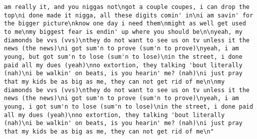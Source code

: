 \documentclass[]{article}
\begin{document}
\begin{verbatim}
am really it, and you niggas not\ngot a couple coupes, i can drop the top\ni done made it nigga, all these digits comin' in\ni am savin' for the bigger picture\nknow one day i need them\nmight as well get used to me\nmy biggest fear is endin' up where you should be\n\nyeah, my diamonds be vvs (vvs)\nthey do not want to see us on tv unless it the news (the news)\ni got sum'n to prove (sum'n to prove)\nyeah, i am young, but got sum'n to lose (sum'n to lose)\nin the street, i done paid all my dues (yeah)\nno extortion, they talking 'bout literally (nah)\ni be walkin' on beats, is you hearin' me? (nah)\ni just pray that my kids be as big as me, they can not get rid of me\n\nmy diamonds be vvs (vvs)\nthey do not want to see us on tv unless it the news (the news)\ni got sum'n to prove (sum'n to prove)\nyeah, i am young, i got sum'n to lose (sum'n to lose)\nin the street, i done paid all my dues (yeah)\nno extortion, they talking 'bout literally (nah)\ni be walkin' on beats, is you hearin' me? (nah)\ni just pray that my kids be as big as me, they can not get rid of me\n"                                                                                                                                                                                                                                                                                                                                                                                                                                                                                                                                                                                                                                                                                                                                                                                                                                                                                                                                                                                                                                                                                                                                                                                                                                                                                                                                                                                                                                                                                                                                                                                                                                                                                                                                                                                                                                                                      

\end{verbatim}
\end{document}
